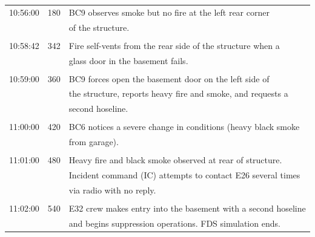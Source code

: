 \documentclass[12pt,oneside]{book}
\begin{document}
\begin{table}[!ht]
\begin{tabular}{ccl}
10:56:00       &  180         &  BC9 observes smoke but no fire at the left rear corner           \\
               &              &  of the structure.                                                \\
               &              &                                                                   \\
10:58:42       &  342         &  Fire self-vents from the rear side of the structure when a       \\
               &              &  glass door in the basement fails.                                \\
               &              &                                                                   \\
10:59:00       &  360         &  BC9 forces open the basement door on the left side of            \\
               &              &  the structure, reports heavy fire and smoke, and requests a      \\
               &              &  second hoseline.                                                 \\
               &              &                                                                   \\
11:00:00       &  420         &  BC6 notices a severe change in conditions (heavy black smoke     \\
               &              &  from garage).                                                    \\
               &              &                                                                   \\
11:01:00       &  480         &  Heavy fire and black smoke observed at rear of structure.        \\
               &              &  Incident command (IC) attempts to contact E26 several times      \\
               &              &  via radio with no reply.                                         \\
               &              &                                                                   \\
11:02:00       &  540         &  E32 crew makes entry into the basement with a second hoseline    \\
               &              &  and begins suppression operations. FDS simulation ends.          \\

\end{tabular}
\end{table}
\end{document}
